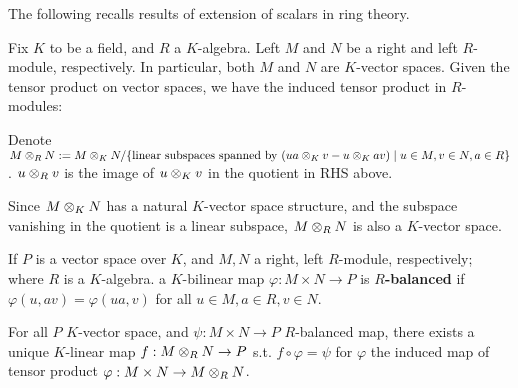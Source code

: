 \textstart
The following recalls results of extension of scalars in ring theory.

Fix $K$ to be a field, and $R$ a $K$-algebra. Left $M$ and $N$ be a right and left $R$-module, respectively. In particular, both $M$ and $N$ are $K$-vector spaces. Given the tensor product on vector spaces, we have the induced tensor product in $R$-modules:

\begin{notation}
    Denote $M \otimes_R N := M \otimes_K N / \{\text{linear subspaces spanned by $(ua \otimes_K v - u \otimes_K av) \mid u \in M, v \in N, a \in R$}\}$. $u \otimes_R v$ is the image of $u \otimes_K v$ in the quotient in RHS above.
\end{notation}

\begin{remark}
    Since $M \otimes_K N$ has a natural $K$-vector space structure, and the subspace vanishing in the quotient is a linear subspace, $M \otimes_R N$ is also a $K$-vector space.
\end{remark}

\begin{definition}[Balanced]
    If $P$ is a vector space over $K$, and $M, N$ a right, left $R$-module, respectively; where $R$ is a $K$-algebra. a $K$-bilinear map $\varphi: M \times N \to P$ is \textbf{$R$-balanced} if $\varphi(u, av) = \varphi(ua, v)$ for all $u \in M, a \in R, v \in N$.
\end{definition}

\begin{proposition}
    For all $P$ $K$-vector space, and $\psi: M \times N \to P$ $R$-balanced map, there exists a unique $K$-linear map $f: M \otimes_R N \to P$ s.t. $f \circ \varphi = \psi$ for $\varphi$ the induced map of tensor product $\varphi: M \times N \to M \otimes_R N$.
\end{proposition}

